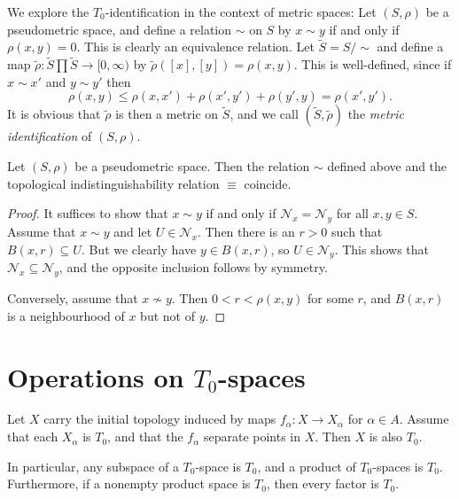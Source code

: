 \documentclass[article, a4paper, 11pt, oneside]{memoir}
\numberwithin{equation}{chapter}
\newcommand{\calN}{\mathcal{N}}
\newcommand{\nhoodfilter}[1]{\calN_{#1}}
\begin{document}
We explore the $T_0$-identification in the context of metric spaces: Let $(S,\rho)$ be a pseudometric space, and define a relation $\sim$ on $S$ by $x \sim y$ if and only if $\rho(x,y) = 0$. This is clearly an equivalence relation. Let $\tilde{S} = S/{\sim}$ and define a map $\tilde{\rho} \colon \tilde{S} \prod \tilde{S} \to [0,\infty)$ by $\tilde{\rho}([x],[y]) = \rho(x,y)$. This is well-defined, since if $x \sim x'$ and $y \sim y'$ then
%
\begin{equation*}
    \rho(x,y)
        \leq \rho(x,x') + \rho(x',y') + \rho(y',y)
        = \rho(x',y').
\end{equation*}
%
It is obvious that $\tilde{\rho}$ is then a metric on $\tilde{S}$, and we call $(\tilde{S}, \tilde{\rho})$ the \emph{metric identification} of $(S,\rho)$.

\begin{proposition}
    Let $(S,\rho)$ be a pseudometric space. Then the relation $\sim$ defined above and the topological indistinguishability relation $\equiv$ coincide.
\end{proposition}

\begin{proof}
    It suffices to show that $x \sim y$ if and only if $\nhoodfilter{x} = \nhoodfilter{y}$ for all $x,y \in S$. Assume that $x \sim y$ and let $U \in \nhoodfilter{x}$. Then there is an $r > 0$ such that $B(x,r) \subseteq U$. But we clearly have $y \in B(x,r)$, so $U \in \nhoodfilter{y}$. This shows that $\nhoodfilter{x} \subseteq \nhoodfilter{y}$, and the opposite inclusion follows by symmetry.

    Conversely, assume that $x \not\sim y$. Then $0 < r < \rho(x,y)$ for some $r$, and $B(x,r)$ is a neighbourhood of $x$ but not of $y$.
\end{proof}


\section[Operations on T0-spaces][Operations on $T_0$-spaces]{Operations on $T_0$-spaces}


\begin{proposition}
    \label{thm:T0-initial-topology}
    Let $X$ carry the initial topology induced by maps $f_\alpha \colon X \to X_\alpha$ for $\alpha \in A$. Assume that each $X_\alpha$ is $T_0$, and that the $f_\alpha$ separate points in $X$. Then $X$ is also $T_0$.

    In particular, any subspace of a $T_0$-space is $T_0$, and a product of $T_0$-spaces is $T_0$. Furthermore, if a nonempty product space is $T_0$, then every factor is $T_0$. %
\end{proposition}
\end{document}
